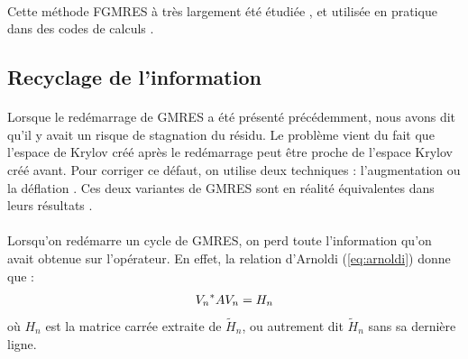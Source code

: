     \paragraph{}
    Cette méthode FGMRES à très largement été étudiée \cite{CoulaudGiraudRametEtAl2013, Vasseur2016}, et utilisée en pratique dans des codes de calculs \cite{Pinel2010}.


  \subsection{Recyclage de l'information}

    \paragraph{}
    Lorsque le redémarrage de GMRES a été présenté précédemment, nous avons dit qu'il y avait un risque de stagnation du résidu.
    Le problème vient du fait que l'espace de Krylov créé après le redémarrage peut être proche de l'espace Krylov créé avant.
    Pour corriger ce défaut, on utilise deux techniques : l'augmentation ou la déflation \cite{ChapmanSaad1997, RamosKehlNabben2020}.
    Ces deux variantes de GMRES sont en réalité équivalentes dans leurs résultats \cite{CoulaudGiraudRametEtAl2013}.

    \paragraph{}
    Lorsqu'on redémarre un cycle de GMRES, on perd toute l'information qu'on avait obtenue sur l'opérateur.
    En effet, la relation d'Arnoldi (\ref{eq:arnoldi}) donne que :
    \[{V_n}^*AV_n = H_n\]
    où $H_n$ est la matrice carrée extraite de $\widetilde{H}_n$, ou autrement dit $\widetilde{H}_n$ sans sa dernière ligne.

